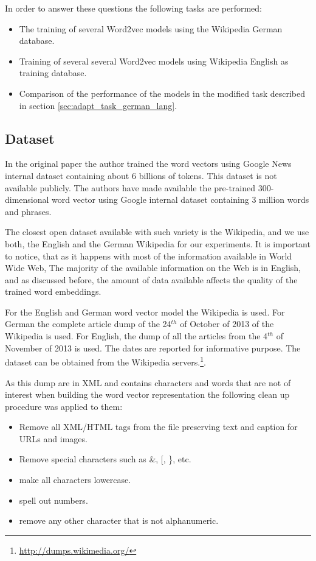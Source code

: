 In order to answer these questions the following tasks are performed:

\begin{itemize}
\item The training of several Word2vec models using the Wikipedia German
  database.
\item Training of several several Word2vec models using Wikipedia English as
  training  database.
\item Comparison of the performance of the models in the modified task
  described in section \ref{sec:adapt_task_german_lang}.
\end{itemize}


\subsection{Dataset}
\label{experiments:sub:dataset}

In the original paper \cite{DBLP:journals/corr/abs-1301-3781} the author
trained the word vectors using Google News internal dataset containing about
6 billions of tokens. This dataset is not available publicly. The authors have made
available the pre-trained 300-dimensional  word vector  using Google internal
dataset containing 3 million words and phrases.

The closest open dataset available with such variety is the Wikipedia, and
we use both, the English and the German Wikipedia for our experiments.  It is
important to notice, that as it happens with most of the information
available in World Wide Web, The majority of the available information on the
Web is in English, and as discussed before, the amount of data available affects the quality  of the trained
word embeddings. 

For the English and German word vector model  the Wikipedia is used. For
German the complete article dump of the 24$^{th}$ of October of 2013  of the
Wikipedia is used.  For English, the dump of all the articles from the
4$^{th}$ of November of 2013 is used. The dates are reported for informative
purpose. The dataset can be obtained from the Wikipedia
servers.\footnote{\url{http://dumps.wikimedia.org/}}.

As this dump are in XML and contains characters and words that are not of
interest when building the word vector representation the following clean up
procedure was applied to them:

\begin{itemize}
\item Remove all XML/HTML tags from the file preserving text and caption for
 URLs and images.
\item Remove special characters such as \&,  [, \}, etc.
\item make all characters lowercase.
\item spell out numbers.
\item remove any other character that is not alphanumeric.
\end{itemize}

